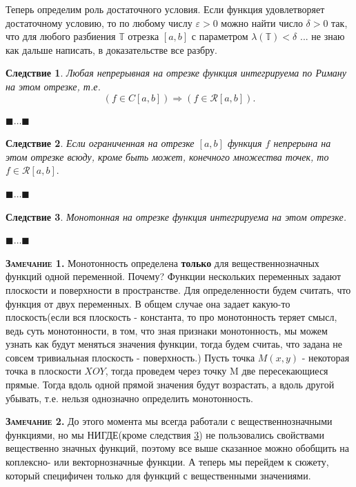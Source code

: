 \documentclass[a4paper,14pt]{article} %
\newtheorem{consequence}{Следствие}
\begin{document}
    Теперь определим роль достаточного условия. Если функция удовлетворяет достаточному условию, то по любому числу \(\varepsilon > 0\) можно найти число \(\delta > 0\) так, что для любого разбиения \(\mathbb{T}\) отрезка \( [a,b] \) с параметром \(\lambda(\mathbb{T}) < \delta\) ...  не знаю как дальше написать, в доказательстве все разбру.
    
    
    \begin{consequence}
    Любая непрерывная на отрезке функция интегрируема по Риману на этом отрезке, т.е.
    \[
    (f \in C[a,b]) \Rightarrow (f \in \mathscr{R}[a,b]).
    \]
    \end{consequence}
    
    \(\blacksquare \dots \blacksquare\)
    
    \begin{consequence}
    \textnormal{
    Если ограниченная на отрезке \( [a,b] \) функция \(f\) непрерына на этом отрезке всюду, кроме быть может, конечного множества точек, то \(f \in \mathscr{R}[a,b].\)
    }
    \end{consequence}
    
    \(\blacksquare \dots \blacksquare\)
    
    \begin{consequence}\label{conseq:monotonic}
    Монотонная на отрезке функция интегрируема на этом отрезке. 
    \end{consequence} 
    
    \(\blacksquare \dots \blacksquare\) 
    
    \textsc{\textbf{Замечание 1.}} Монотонность определена \textbf{только} для вещественнозначных функций одной переменной. Почему? Функции нескольких переменных задают плоскости и поверхности в пространстве. Для определенности будем считать, что функция от двух переменных. В общем случае она задает какую-то плоскость(если вся плоскость - константа, то про монотонность теряет смысл, ведь суть монотонности, в том, что зная признаки монотонность, мы можем узнать как будут меняться значения функции, тогда будем считаь, что задана не совсем тривиальная плоскость - поверхность.) Пусть точка $M(x,y)$ - некоторая точка в плоскости $XOY$, тогда проведем через точку M две пересекающиеся прямые. Тогда вдоль одной прямой значения будут возрастать, а вдоль другой убывать, т.е. нельзя однозначно определить монотонность.
    
    \bigskip
    \textsc{\textbf{Замечание 2.}} До этого момента мы всегда работали с вещественнозначными функциями, но мы НИГДЕ(кроме следствия \ref{conseq:monotonic}) не пользовались свойствами вещественно значных функций, поэтому все выше сказанное можно обобщить на коплексно- или векторнозначные функции. А теперь мы перейдем к сюжету, который специфичен только для функций с вещественными значениями. 
    
\end{document}
